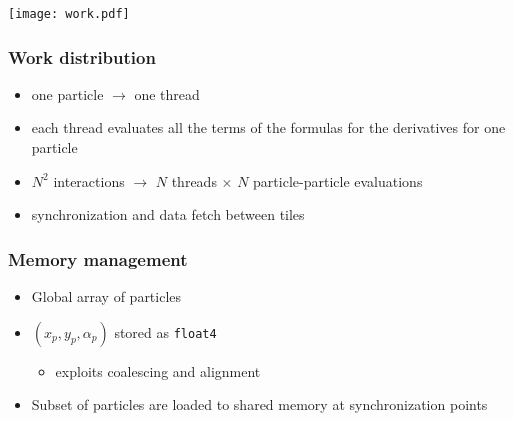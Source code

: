 \documentclass[12pt,english]{beamer}
\begin{document}
  \begin{frame}
    \centering
    \texttt{[image: work.pdf]}
  \end{frame}

  \begin{frame}
    \frametitle{Work distribution}
    \begin{itemize}
      \item one particle \(\longrightarrow\) one thread
      \item each thread evaluates all the terms
        of the formulas for the derivatives
        for one particle
      \item \(N^2\) interactions \(\longrightarrow\)
        \(N\) threads \(\times\) \(N\) particle-particle evaluations
      \item synchronization and data fetch between tiles
    \end{itemize}
  \end{frame}

  \begin{frame}
    \frametitle{Memory management}
    \begin{itemize}
      \item Global array of particles
      \item \((x_p, y_p, α_p)\) stored as \texttt{float4}
        \begin{itemize}
          \item exploits coalescing and alignment
        \end{itemize}
      \item Subset of particles
        are loaded to shared memory
        at synchronization points
    \end{itemize}
  \end{frame}
\end{document}
